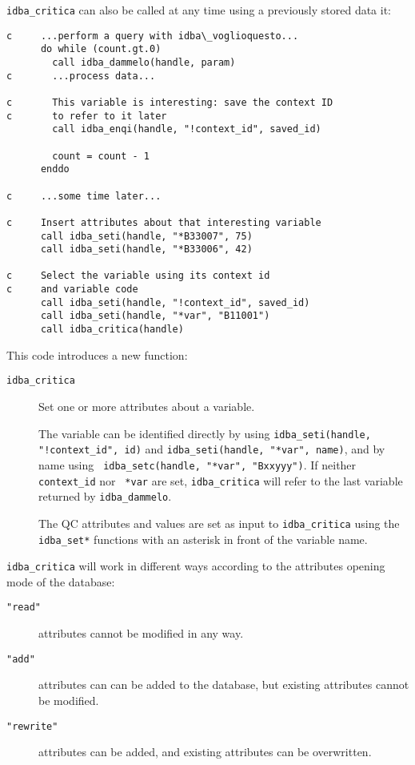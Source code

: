 \documentclass[final,12pt,a4paper,twoside]{book}
\begin{document}
{\tt idba\_critica} can also be called at any time using a previously stored data it:

\begin{verbatim}
c     ...perform a query with idba\_voglioquesto...
      do while (count.gt.0)
        call idba_dammelo(handle, param)
c       ...process data...

c       This variable is interesting: save the context ID
c       to refer to it later
        call idba_enqi(handle, "!context_id", saved_id)
        
        count = count - 1
      enddo

c     ...some time later...

c     Insert attributes about that interesting variable
      call idba_seti(handle, "*B33007", 75)
      call idba_seti(handle, "*B33006", 42)
      
c     Select the variable using its context id
c     and variable code
      call idba_seti(handle, "!context_id", saved_id)
      call idba_seti(handle, "*var", "B11001")
      call idba_critica(handle)
\end{verbatim}

This code introduces a new function:

\begin{description}
\item[{\tt idba\_critica}]
  Set one or more attributes about a variable.
  
  The variable can be identified directly by using {\tt idba\_seti(handle, "!context\_id",
  id)} and {\tt idba\_seti(handle, "*var", name)}, and by name using {\tt
  idba\_setc(handle, "*var", "Bxxyyy")}.  If neither {\tt *context\_id} nor {\tt
  *var} are set, {\tt idba\_critica} will refer to the last variable returned
  by {\tt idba\_dammelo}.

  The QC attributes and values are set as input to {\tt idba\_critica} using the
  {\tt idba\_set*} functions with an asterisk in front of the variable name.
\end{description}


{\tt idba\_critica} will work in different ways according to the attributes
opening mode of the database:

\begin{description}
\item[{\tt "read"}] attributes cannot be modified in any way.
\item[{\tt "add"}] attributes can can be added to the database, but existing
		   attributes cannot be modified.
\item[{\tt "rewrite"}] attributes can be added, and existing attributes can be
                   overwritten.
\end{description}
\end{document}
